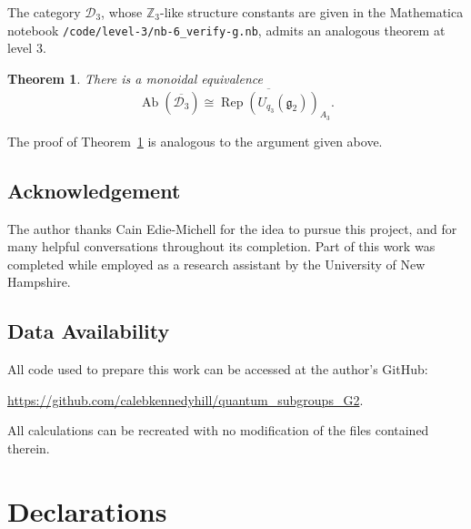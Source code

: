 \documentclass[pdflatex,sn-mathphys-num]{sn-jnl}%
\theoremstyle{thmstyleone}%
\newtheorem{theorem}{Theorem}
\theoremstyle{thmstyletwo}%
\theoremstyle{thmstylethree}%
\newcommand{\Z}{\mathbb{Z}}
\newcommand{\DD}{\mathcal{D}}
\newcommand{\ol}{\overline}
\renewcommand{\gg}{\mathfrak{g}}
\DeclareMathOperator{\Rep}{Rep}
\DeclareMathOperator{\Ab}{Ab}
\begin{document}
The category $\DD_3$, whose $\Z_3$-like structure constants are given in the Mathematica notebook
\verb|/code/level-3/nb-6_verify-g.nb|, admits an analogous theorem at level 3.

\begin{theorem}\label{thm:level-3}
    There is a monoidal equivalence
    \[
        \Ab(\ol{\DD_3}) \cong \ol{ \Rep(U_{q_3}(\gg_2))}_{A_3}.
    \]
\end{theorem}

The proof of Theorem~\ref{thm:level-3} is analogous to the argument given above.














\subsection*{Acknowledgement}
The author thanks Cain Edie-Michell for the idea to pursue this project,
and for many helpful conversations throughout its completion.
Part of this work was completed while employed as a research assistant 
by the University of New Hampshire.


\subsection*{Data Availability}
All code used to prepare this work can be accessed at the author's GitHub:  
\begin{center}
    \href{https://github.com/calebkennedyhill/quantum_subgroups_G2}
    {https://github.com/calebkennedyhill/quantum\_subgroups\_G2}.
\end{center}
All calculations can be recreated with no modification of the files contained therein.






\section*{Declarations}
\end{document}
